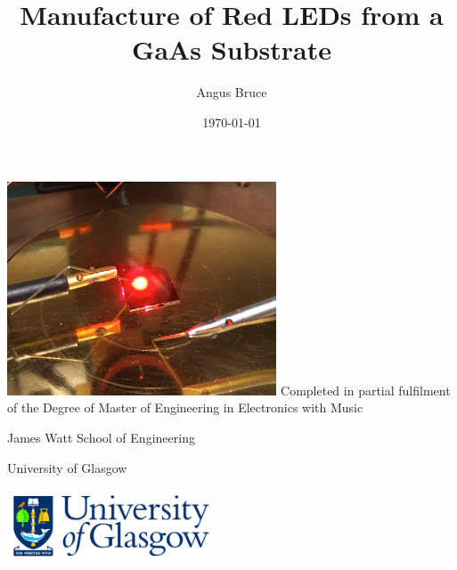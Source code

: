 \documentclass[a4paper]{article}
\title{Manufacture of Red LEDs from a GaAs Substrate}
\author{Angus Bruce}\date{\today}
\begin{document}
  \clearpage
\vfill
  \maketitle
  \begin{center}
    \vfill
    \includegraphics[width=8cm]{Figures/LED_on_picture.jpeg}
    \vfill
    Completed in partial fulfilment of the Degree of Master of Engineering in Electronics with Music

    \vspace{1.5cm}

    James Watt School of Engineering

    University of Glasgow

    \vfill
    \includegraphics[width=6cm]{Figures/logo-glasgow-university-1-transparent.png}
    \vfill
  \end{center}
  \thispagestyle{empty}





  \newpage
  \pagestyle{empty}
  \tableofcontents
  \listoffigures
  \listoftables


  \newpage
  \pagestyle{plain}

  

  

  

  

  
\end{document}
